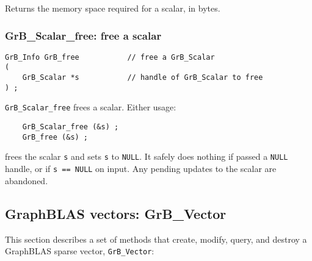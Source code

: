 \documentclass[12pt]{article}
\begin{document}
Returns the memory space required for a scalar, in bytes.

\subsubsection{{\sf GrB\_Scalar\_free:} free a scalar}
\label{scalar_free}

\begin{mdframed}[userdefinedwidth=6in]
{\footnotesize
\begin{verbatim}
GrB_Info GrB_free           // free a GrB_Scalar
(
    GrB_Scalar *s           // handle of GrB_Scalar to free
) ;
\end{verbatim}
} \end{mdframed}

\verb'GrB_Scalar_free' frees a scalar.  Either usage:

    {\small
    \begin{verbatim}
    GrB_Scalar_free (&s) ;
    GrB_free (&s) ; \end{verbatim}}

\noindent
frees the scalar \verb's' and sets \verb's' to \verb'NULL'.  It safely
does nothing if passed a \verb'NULL' handle, or if \verb's == NULL' on input.
Any pending updates to the scalar are abandoned.

\newpage
\subsection{GraphBLAS vectors: {\sf GrB\_Vector}} %
\label{vector}

This section describes a set of methods that create, modify, query,
and destroy a GraphBLAS sparse vector, \verb'GrB_Vector':
\end{document}
